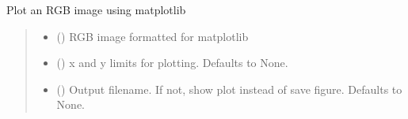 \documentclass[letterpaper,10pt,english]{sphinxmanual}
\begin{document}
\begin{fulllineitems}
\label{\detokenize{modules:cubespa.plotting.util_plots.limit_plot}}
\pysigstartsignatures
{}
\pysigstopsignatures
\end{fulllineitems}


\begin{fulllineitems}
\label{\detokenize{modules:cubespa.plotting.util_plots.plot_bbox}}
\pysigstartsignatures
{}
\pysigstopsignatures
\end{fulllineitems}


\begin{fulllineitems}
\label{\detokenize{modules:cubespa.plotting.util_plots.plot_rgb}}
\pysigstartsignatures
{}
\pysigstopsignatures
\sphinxAtStartPar
Plot an RGB image using matplotlib
\begin{quote}\begin{description}
\begin{itemize}
\item {} 
\sphinxAtStartPar
{} () \textendash{} RGB image formatted for matplotlib

\item {} 
\sphinxAtStartPar
{} (\sphinxstyleliteralemphasis{\sphinxupquote{, }}) \textendash{} x and y limits for plotting. Defaults to None.

\item {} 
\sphinxAtStartPar
{} (\sphinxstyleliteralemphasis{\sphinxupquote{, }}) \textendash{} Output filename. If not, show plot instead of
save figure. Defaults to None.

\end{itemize}

\end{description}\end{quote}

\end{fulllineitems}
\end{document}

